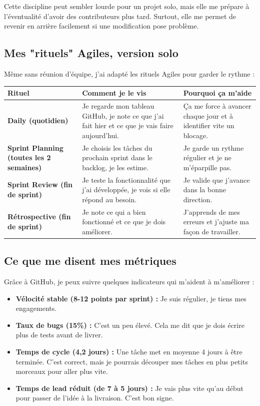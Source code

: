 Cette discipline peut sembler lourde pour un projet solo, mais elle me prépare à l'éventualité d'avoir des contributeurs plus tard. Surtout, elle me permet de revenir en arrière facilement si une modification pose problème.

\subsection{Mes "rituels" Agiles, version solo}

Même sans réunion d'équipe, j'ai adapté les rituels Agiles pour garder le rythme :

\begin{center}
\begin{tabular}{|p{3cm}|p{4cm}|p{4cm}|}
\hline
\textbf{Rituel} & \textbf{Comment je le vis} & \textbf{Pourquoi ça m'aide} \\
\hline
\textbf{Daily (quotidien)} & Je regarde mon tableau GitHub, je note ce que j'ai fait hier et ce que je vais faire aujourd'hui. & Ça me force à avancer chaque jour et à identifier vite un blocage. \\
\hline
\textbf{Sprint Planning (toutes les 2 semaines)} & Je choisis les tâches du prochain sprint dans le backlog, je les estime. & Je garde un rythme régulier et je ne m'éparpille pas. \\
\hline
\textbf{Sprint Review (fin de sprint)} & Je teste la fonctionnalité que j'ai développée, je vois si elle répond au besoin. & Je valide que j'avance dans la bonne direction. \\
\hline
\textbf{Rétrospective (fin de sprint)} & Je note ce qui a bien fonctionné et ce que je dois améliorer. & J'apprends de mes erreurs et j'ajuste ma façon de travailler. \\
\hline
\end{tabular}
\end{center}

\subsection{Ce que me disent mes métriques}

Grâce à GitHub, je peux suivre quelques indicateurs qui m'aident à m'améliorer :

\begin{itemize}
    \item \textbf{Vélocité stable (8-12 points par sprint) :} Je suis régulier, je tiens mes engagements.
    \item \textbf{Taux de bugs (15\%) :} C'est un peu élevé. Cela me dit que je dois écrire plus de tests avant de livrer.
    \item \textbf{Temps de cycle (4,2 jours) :} Une tâche met en moyenne 4 jours à être terminée. C'est correct, mais je pourrais découper mes tâches en plus petits morceaux pour aller plus vite.
    \item \textbf{Temps de lead réduit (de 7 à 5 jours) :} Je vais plus vite qu'au début pour passer de l'idée à la livraison. C'est bon signe.
\end{itemize}

